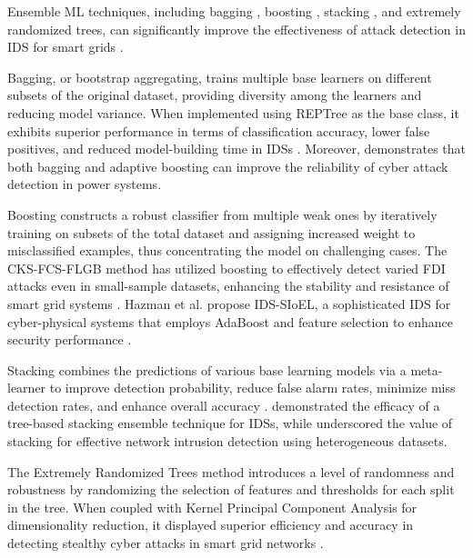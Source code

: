 \documentclass[10pt, journal]{IEEEtran}
\begin{document}
Ensemble ML techniques, including bagging \cite{breiman1996bagging}, boosting \cite{bartlett1998boosting}, stacking \cite{wolpert1992stacked}, and extremely randomized trees, can significantly improve the effectiveness of attack detection in IDS for smart grids \cite{tama2021ensemble, aburomman2017survey, syarif2012application}.

Bagging, or bootstrap aggregating, trains multiple base learners on different subsets of the original dataset, providing diversity among the learners and reducing model variance. When implemented using REPTree as the base class, it exhibits superior performance in terms of classification accuracy, lower false positives, and reduced model-building time in IDSs \cite{gaikwad2015intrusion}. Moreover, \cite{chen2018ensemble} demonstrates that both bagging and adaptive boosting can improve the reliability of cyber attack detection in power systems.

Boosting constructs a robust classifier from multiple weak ones by iteratively training on subsets of the total dataset and assigning increased weight to misclassified examples, thus concentrating the model on challenging cases. The CKS-FCS-FLGB method has utilized boosting to effectively detect varied FDI attacks even in small-sample datasets, enhancing the stability and resistance of smart grid systems \cite{cao2020novel}. Hazman et al. propose IDS-SIoEL, a sophisticated IDS for cyber-physical systems that employs AdaBoost and feature selection to enhance security performance \cite{hazman2023lids}.

Stacking combines the predictions of various base learning models via a meta-learner to improve detection probability, reduce false alarm rates, minimize miss detection rates, and enhance overall accuracy \cite{khoei2021ensemble}. \cite{rashid2022tree} demonstrated the efficacy of a tree-based stacking ensemble technique for IDSs, while \cite{rajagopal2020stacking} underscored the value of stacking for effective network intrusion detection using heterogeneous datasets.

The Extremely Randomized Trees method introduces a level of randomness and robustness by randomizing the selection of features and thresholds for each split in the tree. When coupled with Kernel Principal Component Analysis for dimensionality reduction, it displayed superior efficiency and accuracy in detecting stealthy cyber attacks in smart grid networks \cite{acosta2020extremely}.
			
\end{document}
